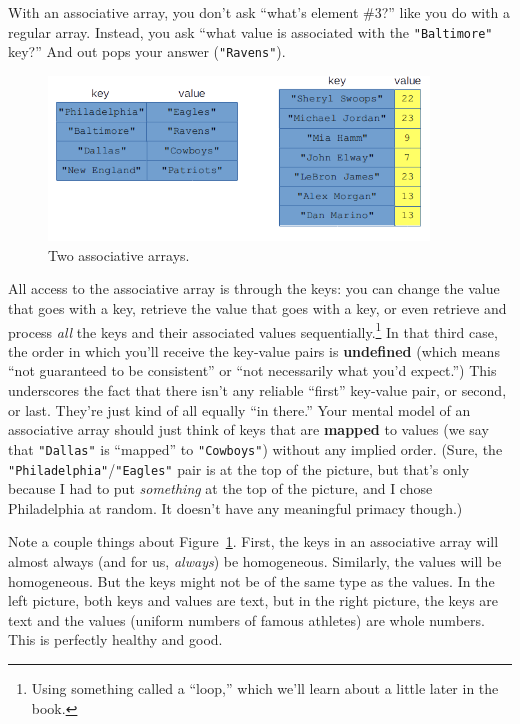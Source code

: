 With an associative array, you don't ask ``what's element \#3?'' like you do
with a regular array. Instead, you ask ``what value is associated with the
\texttt{"Baltimore"} key?'' And out pops your answer (\texttt{"Ravens"}).

\begin{figure}[ht]
\centering
\includegraphics[width=0.9\textwidth]{assocArray.png}
\caption{Two associative arrays.}
\label{fig:assocArray}
\end{figure}

All access to the associative array is through the keys: you can change the
value that goes with a key, retrieve the value that goes with a key, or even
retrieve and process \textit{all} the keys and their associated values
sequentially.\footnote{Using something called a ``loop,'' which we'll learn
about a little later in the book.} In that third case, the order in which
you'll receive the key-value pairs is \textbf{undefined} (which means ``not
guaranteed to be consistent'' or ``not necessarily what you'd expect.'') This
underscores the fact that there isn't any reliable ``first'' key-value pair,
or second, or last. They're just kind of all equally ``in there.'' Your mental
model of an associative array should just think of keys that are
\textbf{mapped} to values (we say that \texttt{"Dallas"} is ``mapped'' to
\texttt{"Cowboys"}) without any implied order. (Sure, the
\texttt{"Philadelphia"}/\texttt{"Eagles"} pair is at the top of the picture,
but that's only because I had to put \textit{something} at the top of the
picture, and I chose Philadelphia at random. It doesn't have any meaningful
primacy though.)

 Note a couple things about Figure~\ref{fig:assocArray}.
First, the keys in an associative array will almost always (and for us,
\textit{always}) be homogeneous. Similarly, the values will be homogeneous. But
the keys might not be of the same type as the values. In the left picture, both
keys and values are text, but in the right picture, the keys are text and the
values (uniform numbers of famous athletes) are whole numbers. This is
perfectly healthy and good.

